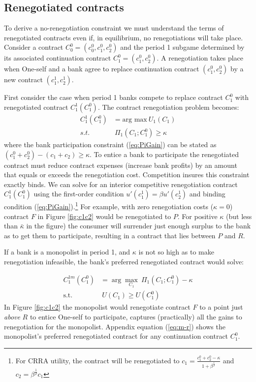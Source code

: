 \documentclass[11pt,english]{article}
\theoremstyle{plain}
\theoremstyle{definition}
\begin{document}
\subsection{Renegotiated contracts}

To derive a no-renegotiation constraint we must understand the
terms of renegotiated contracts even if, in equilibrium, no renegotiations
will take place. Consider a contract $C_{0}^{0}=(c_{0}^{0},c_{1}^{0},c_{2}^{0})$
and the period 1 subgame determined by its associated continuation
contract $C_{1}^{0}=(c_{1}^{0},c_{2}^{0})$. A renegotiation takes
place when One-self and a bank agree to replace continuation contract
$(c_{1}^{0},c_{2}^{0})$ by a new contract $\left(c_{1}^{1},c_{2}^{1}\right)$.

First consider the case when period 1 banks compete to replace contract
$C_{1}^{0}$ with renegotiated contract $C_{1}^{1}(C_{1}^{0})$. The
contract renegotiation problem becomes: 
\begin{align}
C_{1}^{1}(C_{1}^{0}) & =\text{arg max}\ U_{1}(C_{1})\\
s.t. & \ \Pi_{1}(C_{1};C_{1}^{0})\ge\kappa\label{eq:PiGain}
\end{align}
{}where the bank participation constraint (\ref{eq:PiGain}) can be stated
as $(c_{1}^{0}+c_{2}^{0})-(c_{1}+c_{2})\ge\kappa$. To entice a bank
to participate the renegotiated contract must reduce contract expenses (increase bank profits) by an amount that equals or exceeds the
renegotiation cost. Competition insures this constraint exactly
binds. We can solve for an
interior competitive renegotiation contract $C_{1}^{1}(C_{1}^{0})$ using the first-order condition $u'(c_{1}^{1})=\beta u'(c_{2}^{1})$
and binding condition (\ref{eq:PiGain}).\footnote{ For CRRA utility, the contract will be renegotiated to $c_{1}=\frac{c_{1}^{0}+c_{2}^{0}-\kappa}{1+\beta^{\frac{1}{\rho}}}$
and $c_{2}=\beta^{\frac{1}{\rho}}c_{1}$ } For example, with zero renegotiation costs ($\kappa=0$) contract
$F$ in Figure \ref{fig:c1c2} would be renegotiated to $P$. For
positive $\kappa$ (but less than $\bar{\kappa}$ in the figure) the
consumer will surrender just enough surplus to the bank as to get
them to participate, resulting in a contract that lies between $P$
and $R$.

If a bank is a monopolist in period 1, and $\kappa$ is not so high
as to make renegotiation infeasible, the bank's preferred renegotiated contract would
solve:

\begin{align}
C_{1}^{1m}(C_{1}^{0}) & =\arg\max_{C_{1}}\ \Pi_{1}(C_{1};C_{1}^{0})-\kappa\\
\text{s.t.} & \ U(C_{1})\geq U(C_{1}^{0})\label{eq:ugain}
\end{align}
In Figure \ref{fig:c1c2} the monopolist would renegotiate contract
$F$ to a point just \textit{above }$R$ to entice One-self
to participate, captures (practically) all the gains to renegotiation for the
monopolist. Appendix equation (\ref{eq:m-r}) shows the monopolist's
preferred renegotiated contract for any continuation contract
$C_{1}^{0}$.
\end{document}
